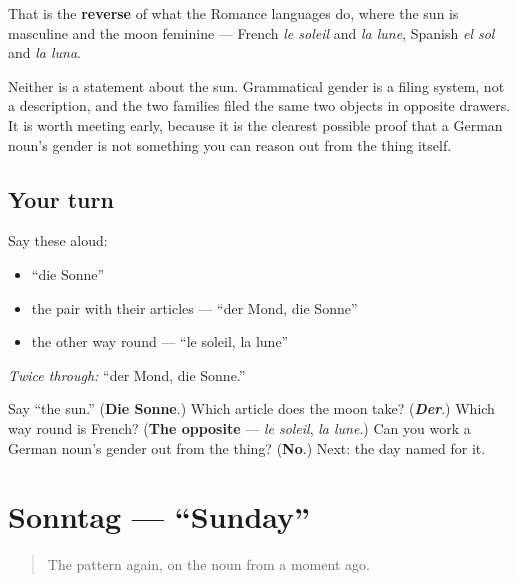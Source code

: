 \begin{culture}
That is the \textbf{reverse} of what the Romance languages do, where the sun is masculine and the moon feminine — French \emph{le soleil} and \emph{la lune}, Spanish \emph{el sol} and \emph{la luna}.

Neither is a statement about the sun. Grammatical gender is a filing system, not a description, and the two families filed the same two objects in opposite drawers. It is worth meeting early, because it is the clearest possible proof that a German noun's gender is not something you can reason out from the thing itself.
\end{culture}

\subsection*{Your turn}
Say these aloud:

\begin{itemize}
\raggedright
  \item \textquotedblleft{}die Sonne\textquotedblright{}
  \item the pair with their articles — \textquotedblleft{}der Mond, die Sonne\textquotedblright{}
  \item the other way round — \textquotedblleft{}le soleil, la lune\textquotedblright{}
\end{itemize}

\emph{Twice through:} \textquotedblleft{}der Mond, die Sonne.\textquotedblright{}

\begin{tcolorbox}[breakable,colback=teal!4,colframe=teal!35!black,title={Before you move on}]
Say \textquotedblleft{}the sun.\textquotedblright{} (\textbf{Die Sonne}.) Which article does the moon take? (\emph{\textbf{Der}}.) Which way round is French? (\textbf{The opposite} — \emph{le soleil}, \emph{la lune}.) Can you work a German noun's gender out from the thing? (\textbf{No}.) Next: the day named for it.
\end{tcolorbox}
\section[Sonntag]{Sonntag — \textquotedblleft{}Sunday\textquotedblright{}}

\label{lesson:GE-C07-sonntag}



\begin{quote}
The pattern again, on the noun from a moment ago.
\end{quote}

